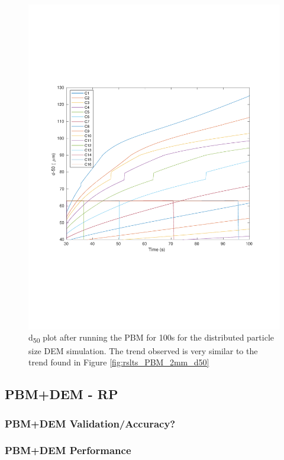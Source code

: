 \documentclass[preprint,11pt,authoryear]{elsarticle}
\begin{document}
\begin{figure}[H]
\centering
\includegraphics[scale=0.5]{rslts_pbm_d50_128_555.pdf}
\caption{d\textsubscript{50} plot after running the PBM for 100s for the distributed particle size DEM 
    simulation. The trend observed is very similar to the trend found in Figure \ref{fig:rslts_PBM_2mm_d50}}
\label{fig:rslts_PBM_psd_d50}
\end{figure}


\subsection{PBM+DEM - RP} 
\subsubsection{PBM+DEM Validation/Accuracy?}
%	    
\subsubsection{PBM+DEM Performance}
%	
\end{document}
